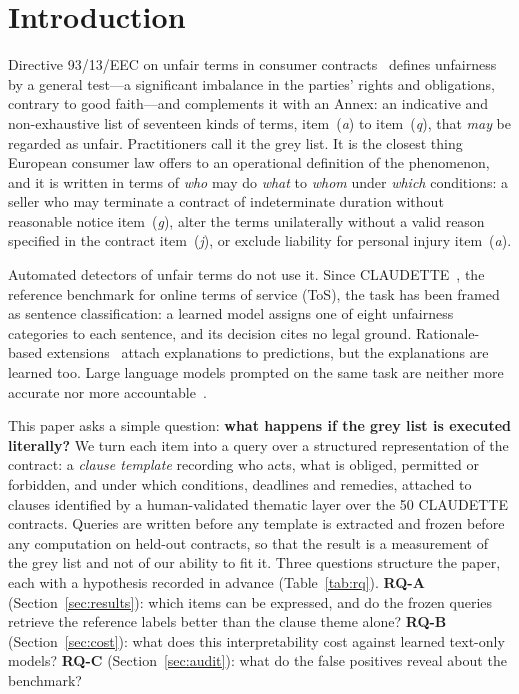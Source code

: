 \documentclass{IOS-Book-Article}
\newcommand{\corpus}{CLAUDETTE}
\newcommand{\gl}[1]{item~(\textit{#1})}
\begin{document}
\section{Introduction}
\label{sec:intro}
Directive 93/13/EEC on unfair terms in consumer contracts~\cite{eu1993directive} defines unfairness by a general test---a significant imbalance in the parties' rights and obligations, contrary to good faith---and complements it with an Annex: an indicative and non-exhaustive list of seventeen kinds of terms, \gl{a} to \gl{q}, that \emph{may} be regarded as unfair. Practitioners call it the grey list. It is the closest thing European consumer law offers to an operational definition of the phenomenon, and it is written in terms of \emph{who} may do \emph{what} to \emph{whom} under \emph{which} conditions: a seller who may terminate a contract of indeterminate duration without reasonable notice \gl{g}, alter the terms unilaterally without a valid reason specified in the contract \gl{j}, or exclude liability for personal injury \gl{a}.

Automated detectors of unfair terms do not use it. Since \corpus{}~\cite{lippi2019claudette}, the reference benchmark for online terms of service (ToS), the task has been framed as sentence classification: a learned model assigns one of eight unfairness categories to each sentence, and its decision cites no legal ground. Rationale-based extensions~\cite{ruggeri2022memory,liepina2020claudettetool} attach explanations to predictions, but the explanations are learned too. Large language models prompted on the same task are neither more accurate nor more accountable~\cite{panarelli2025worth,frasheri2024llm}.

This paper asks a simple question: \textbf{what happens if the grey list is executed literally?} We turn each item into a query over a structured representation of the contract: a \emph{clause template} recording who acts, what is obliged, permitted or forbidden, and under which conditions, deadlines and remedies, attached to clauses identified by a human-validated thematic layer over the 50 \corpus{} contracts. Queries are written before any template is extracted and frozen before any computation on held-out contracts, so that the result is a measurement of the grey list and not of our ability to fit it. Three questions structure the paper, each with a hypothesis recorded in advance (Table~\ref{tab:rq}). \textbf{RQ-A} (Section~\ref{sec:results}): which items can be expressed, and do the frozen queries retrieve the reference labels better than the clause theme alone? \textbf{RQ-B} (Section~\ref{sec:cost}): what does this interpretability cost against learned text-only models? \textbf{RQ-C} (Section~\ref{sec:audit}): what do the false positives reveal about the benchmark?
\end{document}
